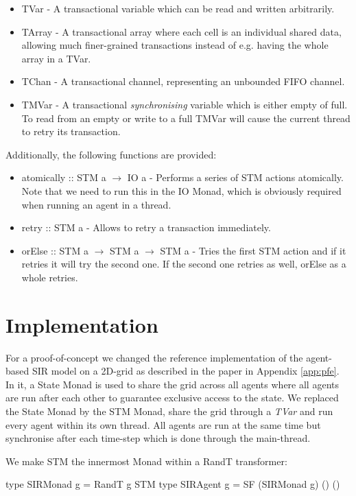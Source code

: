\begin{itemize}
	\item TVar - A transactional variable which can be read and written arbitrarily. 
	\item TArray - A transactional array where each cell is an individual shared data, allowing much finer-grained transactions instead of e.g. having the whole array in a TVar.
	\item TChan - A transactional channel, representing an unbounded FIFO channel.
	\item TMVar - A transactional \textit{synchronising} variable which is either empty of full. To read from an empty or write to a full TMVar will cause the current thread to retry its transaction.
\end{itemize}

Additionally, the following functions are provided:

\begin{itemize}
	\item atomically :: STM a $\to$ IO a - Performs a series of STM actions atomically. Note that we need to run this in the IO Monad, which is obviously required when running an agent in a thread.
	\item retry :: STM a - Allows to retry a transaction immediately.
	\item orElse :: STM a $\to$ STM a $\to$ STM a - Tries the first STM action and if it retries it will try the second one. If the second one retries as well, orElse as a whole retries.
\end{itemize}

\section{Implementation}
\label{sect:stm_impl}
For a proof-of-concept we changed the reference implementation of the agent-based SIR model on a 2D-grid as described in the paper in Appendix \ref{app:pfe}. In it, a State Monad is used to share the grid across all agents where all agents are run after each other to guarantee exclusive access to the state. We replaced the State Monad by the STM Monad, share the grid through a \textit{TVar} and run every agent within its own thread. All agents are run at the same time but synchronise after each time-step which is done through the main-thread.

We make STM the innermost Monad within a RandT transformer:
\begin{HaskellCode}
type SIRMonad g   = RandT g STM
type SIRAgent g   = SF (SIRMonad g) () ()
\end{HaskellCode}

